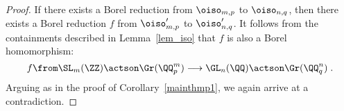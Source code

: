 \documentclass[oneside,leqno,11pt]{amsart}
\begin{document}
\begin{proof}
  If there exists a Borel reduction from $\oiso_{m,p}$ to
  $\oiso_{n,q}$, then there exists a Borel reduction $f$ from
  $\oiso_{m,p}'$ to $\oiso_{n,q}'$.  It follows from the containments
  described in Lemma~\ref{lem_iso} that $f$ is also a Borel
  homomorphism:
  \[f\from\SL_m(\ZZ)\actson\Gr(\QQ_p^m)
  \longrightarrow\GL_n(\QQ)\actson\Gr(\QQ_q^n)\;.
  \]
  Arguing as in the proof of Corollary~\ref{mainthmp1}, we again
  arrive at a contradiction.
\end{proof}


\begin{singlespace}
  
\end{singlespace}
\end{document}
